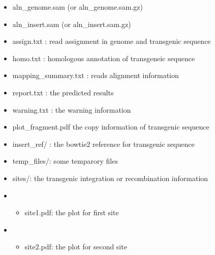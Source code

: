 \documentclass[]{article}
\providecommand{\tightlist}{%
  \setlength{\itemsep}{0pt}\setlength{\parskip}{0pt}}
\begin{document}
\begin{itemize}
\item
  aln\_genome.sam (or aln\_genome.sam.gz)
\item
  aln\_insert.sam (or aln\_insert.sam.gz)
\item
  assign.txt : read assignment in genome and transgenic sequence
\item
  homo.txt : homologous annotation of transgeneic sequence
\item
  mapping\_summary.txt : reads alignment information
\item
  report.txt : the predicted results
\item
  warning.txt : the warning information
\item
  plot\_fragment.pdf the copy information of transgenic sequence
\item
  insert\_ref/ : the bowtie2 reference for transgenic sequence
\item
  temp\_files/: some temparory files
\item
  sites/: the transgenic integration or recombination information
\item
  \begin{itemize}
  \tightlist
  \item
    site1.pdf: the plot for first site
  \end{itemize}
\item
  \begin{itemize}
  \tightlist
  \item
    site2.pdf: the plot for second site
  \end{itemize}
\end{itemize}
\end{document}
